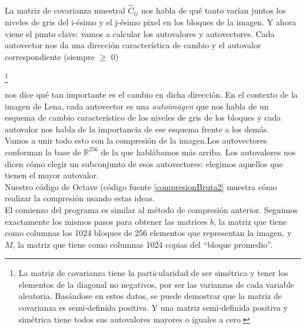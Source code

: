 \documentclass[twocolumn,a4paper,10pt]{article}
\begin{document}
\paragraph*{}

La matriz de covarianza muestral $\widehat{C}_{ij}$ nos habla de qu\'e tanto var\'ian juntos los niveles de gris del i-\'esimo y el j-\'esimo pixel en los bloques 
de la imagen. Y ahora viene  el punto clave: vamos a calcular los autovalores y autovectores. Cada autovector nos da una direcci\'on caracter\'istica de cambio y 
el autovalor correspondiente  (siempre $\geq$ 0) 

\footnote{La matriz de covarianza tiene la particularidad de ser sim\'etrica y tener los elementos de la diagonal no negativos, por ser las 
varianzas de cada variable aleatoria. Bas\'andose en estos datos, se puede demostrar que la matriz de covarianza es semi-definida positiva. Y una matriz semi-definida 
positiva y sim\'etrica tiene todos sus autovalores mayores o iguales a cero.}

 nos dice qu\'e tan importante es el cambio en dicha direcci\'on. En el contexto de la imagen de Lena, cada autovector es una \textit{autoimagen}
que nos habla de un esquema de cambio caracter\'istico de los niveles de gris de los bloques y cada autovalor nos habla de la importancia de ese esquema frente 
a los dem\'as. \\

Vamos a unir todo esto con la compresi\'on de la imagen.Los autovectores conforman la base de $\mathbb{R}^{256}$ de la que habl\'abamos m\'as arriba. 
Los autovalores nos dicen c\'omo elegir un subconjunto de esos autovectores: elegimos aquellos que tienen el mayor autovalor. \\

Nuestro c\'odigo de Octave (c\'odigo fuente \ref{compresionBruta2} muestra c\'omo realizar la compresi\'on usando estas ideas. \\

El comienzo del programa es similar al m\'etodo de compresi\'on anterior. Seguimos exactamente los mismos pasos para obtener las matrices $b$, la matriz que tiene como 
columnas los 1024 bloques de 256 elementos que representan la imagen, y $M$, la matriz que tiene como columnas 1024 copias del ``bloque promedio''.\\ 
\end{document}
